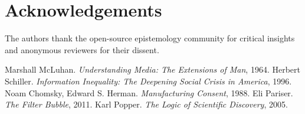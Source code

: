 \documentclass[11pt]{article}
\begin{document}
\section*{Acknowledgements}
The authors thank the open-source epistemology community for critical insights and anonymous reviewers for their dissent.


\begin{thebibliography}{9}
 Marshall McLuhan. \textit{Understanding Media: The Extensions of Man}, 1964.
 Herbert Schiller. \textit{Information Inequality: The Deepening Social Crisis in America}, 1996.
 Noam Chomsky, Edward S. Herman. \textit{Manufacturing Consent}, 1988.
 Eli Pariser. \textit{The Filter Bubble}, 2011.
 Karl Popper. \textit{The Logic of Scientific Discovery}, 2005.
\end{thebibliography}
\end{document}
